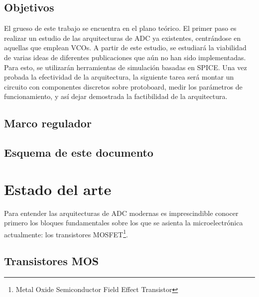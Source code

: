 \documentclass[12pt]{report} %
\begin{document}
	\section{Objetivos}
	
	El grueso de este trabajo se encuentra en el plano teórico. El primer paso es realizar un estudio de las arquitecturas de ADC ya existentes, centrándose en aquellas que emplean VCOs. A partir de este estudio, se estudiará la viabilidad de varias ideas de diferentes publicaciones que aún no han sido implementadas. Para esto, se utilizarán herramientas de simulación basadas en SPICE. Una vez probada la efectividad de la arquitectura, la siguiente tarea será montar un circuito con componentes discretos sobre protoboard, medir los parámetros de funcionamiento, y así dejar demostrada la factibilidad de la arquitectura.

	\section{Marco regulador}
	
	
	\section{Esquema de este documento}
	

	
	

\chapter{Estado del arte}

	Para entender las arquitecturas de ADC modernas es imprescindible conocer primero los bloques fundamentales sobre los que se asienta la microelectrónica actualmente: los transistores MOSFET\footnote{Metal Oxide Semiconductor Field Effect Transistor}.
	
	\section{Transistores MOS}
	
\end{document}
